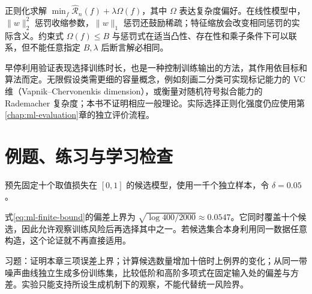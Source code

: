 正则化求解 $\min_f\widehat{\mathcal R}_n(f)+\lambda\Omega(f)$，其中 $\Omega$ 表达复杂度偏好。在线性模型中，$\|w\|_2^2$ 惩罚收缩参数，$\|w\|_1$ 惩罚还鼓励稀疏；特征缩放会改变相同惩罚的实际含义。约束式 $\Omega(f)\leq B$ 与惩罚式在适当凸性、存在性和乘子条件下可以联系，但不能任意指定 $B,\lambda$ 后断言解必相同。

早停利用验证表现选择训练时长，也是一种控制训练输出的方法，其作用依目标和算法而定。无限假设类需更细的容量概念，例如刻画二分类可实现标记能力的 VC 维（Vapnik--Chervonenkis dimension），或衡量对随机符号拟合能力的 Rademacher 复杂度；本书不证明相应一般理论。实际选择正则化强度仍应使用第\ref{chap:ml-evaluation}章的独立评价流程。

\section{例题、练习与学习检查}

\begin{example}[模型数量的代价]
预先固定十个取值损失在 $[0,1]$ 的候选模型，使用一千个独立样本，令 $\delta=0.05$。
\end{example}
\begin{solve}
式\eqref{eq:ml-finite-bound}的偏差上界为 $\sqrt{\log400/2000}\approx0.0547$。它同时覆盖十个候选，因此允许观察训练风险后再选择其中之一。若候选集合本身利用同一数据任意构造，这个论证就不再直接适用。
\end{solve}

习题：证明本章三项误差上界；计算候选数量增加十倍时上例界的变化；从同一带噪声曲线独立生成多份训练集，比较低阶和高阶多项式在固定输入处的偏差与方差。实验只能支持所设生成机制下的观察，不能代替统一风险界。




